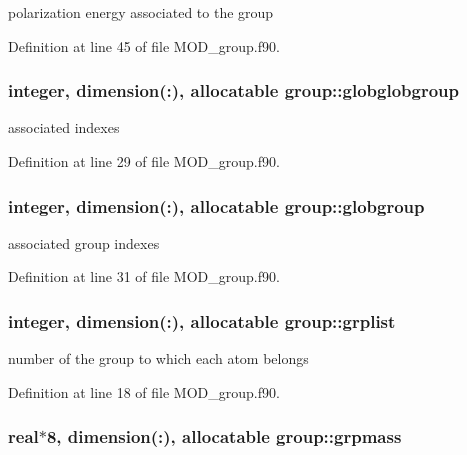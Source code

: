 polarization energy associated to the group 



Definition at line 45 of file M\-O\-D\-\_\-group.\-f90.

\hypertarget{classgroup_a74b6bce17ca40288666afb3985dfb6bd}{
\subsubsection[{globglobgroup}]{\setlength{\rightskip}{0pt plus 5cm}integer, dimension(\-:), allocatable group\-::globglobgroup}}\label{classgroup_a74b6bce17ca40288666afb3985dfb6bd}


associated indexes 



Definition at line 29 of file M\-O\-D\-\_\-group.\-f90.

\hypertarget{classgroup_a98fb8adde914358d37ad222e748ac034}{
\subsubsection[{globgroup}]{\setlength{\rightskip}{0pt plus 5cm}integer, dimension(\-:), allocatable group\-::globgroup}}\label{classgroup_a98fb8adde914358d37ad222e748ac034}


associated group indexes 



Definition at line 31 of file M\-O\-D\-\_\-group.\-f90.

\hypertarget{classgroup_a84fbebdd56f12ecc9b43b0091703fabb}{
\subsubsection[{grplist}]{\setlength{\rightskip}{0pt plus 5cm}integer, dimension(\-:), allocatable group\-::grplist}}\label{classgroup_a84fbebdd56f12ecc9b43b0091703fabb}


number of the group to which each atom belongs 



Definition at line 18 of file M\-O\-D\-\_\-group.\-f90.

\hypertarget{classgroup_ab354edd30c1396b9376acf9100fd63d3}{
\subsubsection[{grpmass}]{\setlength{\rightskip}{0pt plus 5cm}real$\ast$8, dimension(\-:), allocatable group\-::grpmass}}\label{classgroup_ab354edd30c1396b9376acf9100fd63d3}


